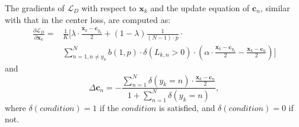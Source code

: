 \documentclass[conference]{acmsiggraph}
\renewcommand{\vec}[1]{\mathbf{#1}}
\begin{document}
The gradients of $\mathcal{L}_{D}$ with respect to $\vec{x}_k$ and the update equation of $\vec{c}_n$, similar with that in the center loss, are computed as:
\begin{equation}
\begin{split}
\frac{\partial \mathcal{L}_{D}}{\partial \vec{x}_k}= & \frac{1}{K} \biggr[ \lambda \cdot \frac{\vec{x}_k - \vec{c}_{y_k}}{2} +  (1 - \lambda )\frac{1}{(N-1) \cdot p} \cdot \\ & \sum \limits_{n=1, n \neq y_k}^{N}b(1,p) \cdot  \delta (L_{k,n}>0) \cdot 
 (\alpha \cdot \frac{\vec{x}_k - \vec{c}_{y_k}}{2} - \frac{\vec{x}_k - \vec{c}_{n}}{2}) \biggr]
\end{split}
\end{equation}
and 
\begin{equation}
\Delta \vec{c}_n = - \frac{\sum \nolimits_{n=1}^N \delta (y_k = n) \cdot \frac{\vec{x}_k - \vec{c}_n}{2}}{ 1 + \sum \nolimits_{n=1}^N \delta (y_k = n) },
\end{equation}
where $\delta (condition) = 1$ if the $condition$ is satisfied, and $\delta (condition) = 0$ if not.
\end{document}

